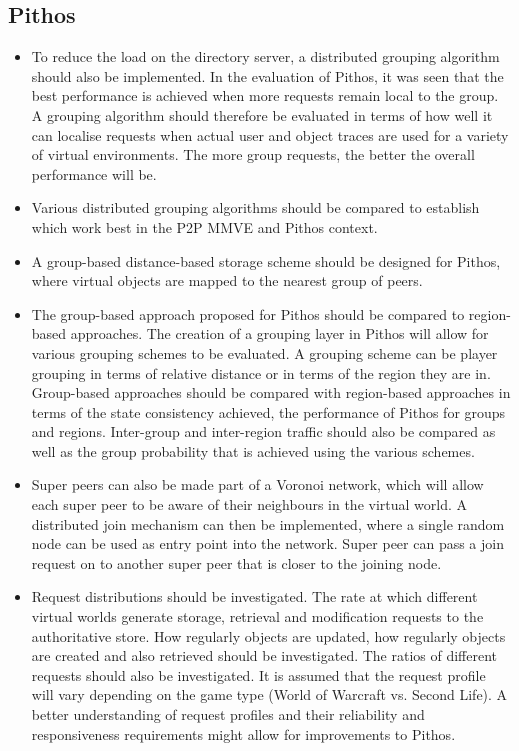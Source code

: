 \subsection{Pithos}
\begin{itemize}
\item To reduce the load on the directory server, a distributed grouping algorithm should also be implemented. In the evaluation of Pithos, it was seen that the best performance is achieved when more requests remain local to the group. A grouping algorithm should therefore be evaluated in terms of how well it can localise requests when actual user and object traces are used for a variety of virtual environments. The more group requests, the better the overall performance will be.

\item Various distributed grouping algorithms should be compared to establish which work best in the P2P MMVE and Pithos context.
    
\item A group-based distance-based storage scheme should be designed for Pithos, where virtual objects are mapped to the nearest group of peers.
    
\item The group-based approach proposed for Pithos should be compared to region-based approaches. The creation of a grouping layer in Pithos will allow for various grouping schemes to be evaluated. A grouping scheme can be player grouping in terms of relative distance or in terms of the region they are in. Group-based approaches should be compared with region-based approaches in terms of the state consistency achieved, the performance of Pithos for groups and regions. Inter-group and inter-region traffic should also be compared as well as the group probability that is achieved using the various schemes.

\item Super peers can also be made part of a Voronoi network, which will allow each super peer to be aware of their neighbours in the virtual world. A distributed join mechanism can then be implemented, where a single random node can be used as entry point into the network. Super peer can pass a join request on to another super peer that is closer to the joining node.
    
\item Request distributions should be investigated. The rate at which different virtual worlds generate storage, retrieval and modification requests to the authoritative store. How regularly objects are updated, how regularly objects are created and also retrieved should be investigated. The ratios of different requests should also be investigated. It is assumed that the request profile will vary depending on the game type (World of Warcraft vs. Second Life). A better understanding of request profiles and their reliability and responsiveness requirements might allow for improvements to Pithos.


\end{itemize}
